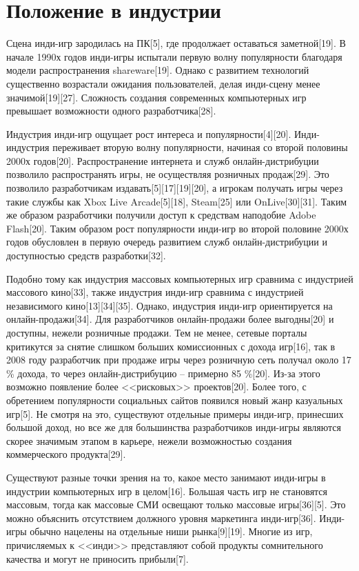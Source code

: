 \section{Положение в индустрии}

Сцена инди-игр зародилась на ПК[5], где продолжает оставаться заметной[19]. В начале 1990х годов инди-игры 
испытали первую волну популярности благодаря модели распространения shareware[19]. Однако с развитием 
технологий существенно возрастали ожидания пользователей, делая инди-сцену менее значимой[19][27]. Сложность 
создания современных компьютерных игр превышает возможности одного разработчика[28].

Индустрия инди-игр ощущает рост интереса и популярности[4][20]. Инди-индустрия переживает вторую волну 
популярности, начиная со второй половины 2000х годов[20]. Распространение интернета и служб 
онлайн-дистрибуции позволило распространять игры, не осуществляя розничных продаж[29]. Это позволило 
разработчикам издавать[5][17][19][20], а игрокам получать игры через такие службы как 
Xbox Live Arcade[5][18], Steam[25] или OnLive[30][31]. Таким же образом разработчики получили доступ к 
средствам наподобие Adobe Flash[20]. Таким образом рост популярности инди-игр во второй половине 2000х 
годов обусловлен в первую очередь развитием служб онлайн-дистрибуции и доступностью средств разработки[32].

Подобно тому как индустрия массовых компьютерных игр сравнима с индустрией массового кино[33], также 
индустрия инди-игр сравнима с индустрией независимого кино[13][34][35]. Однако, индустрия инди-игр 
ориентируется на онлайн-продажи[34]. Для разработчиков онлайн-продажи более выгодны[20] и доступны, нежели 
розничные продажи. Тем не менее, сетевые порталы критикутся за снятие слишком больших комиссионных с дохода 
игр[16], так в 2008 году разработчик при продаже игры через розничную сеть получал около 17 \% дохода, то 
через онлайн-дистрибуцию -- примерно 85 \%[20]. Из-за этого возможно появление более <<рисковых>> 
проектов[20]. Более того, с обретением популярности социальных сайтов появился новый жанр казуальных игр[5]. 
Не смотря на это, существуют отдельные примеры инди-игр, принесших большой доход, но все же для большинства 
разработчиков инди-игры являются скорее значимым этапом в карьере, нежели возможностью создания 
коммерческого продукта[29].

Существуют разные точки зрения на то, какое место занимают инди-игры в индустрии компьютерных игр в 
целом[16]. Большая часть игр не становятся массовым, тогда как массовые СМИ освещают только массовые 
игры[36][5]. Это можно объяснить отсутствием должного уровня маркетинга инди-игр[36]. Инди-игры обычно 
нацелены на отдельные ниши рынка[9][19]. Многие из игр, причисляемых к <<инди>> представляют собой продукты 
сомнительного качества и могут не приносить прибыли[7].

